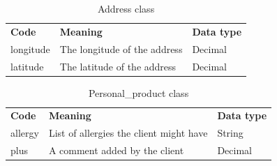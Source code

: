 \documentclass[12pt,a4paper]{report}
\begin{document}
	\begin{table}[H]
		\begin{center}
			\captionsetup[table]{skip=10pt}
			\caption{Address class}
			\setlength\doublerulesep{0.5pt}
			
			\begin{tabular}{|  p{5cm}|  p{6cm}|  p{4cm}|}
				\rowcolor{LightCyan}
				
				\hline
				\multicolumn{3}{c}{Address class}\\
				\hline 
				\textbf{Code} & \textbf{Meaning} & \textbf{Data type} 
				\\ \hline
				
				longitude &                        
				The longitude of the address &                        
				Decimal  
				\\ \hline
				
				latitude &                        
				The latitude of the address &                        
				Decimal            
				
				\\ \hline
				
				
			\end{tabular}
			
		\end{center}
	\end{table}
	\begin{table}[H]
		\begin{center}
			\captionsetup[table]{skip=10pt}
			\caption{Personal\_product class}
			\setlength\doublerulesep{0.5pt}
			
			\begin{tabular}{|  p{5cm}|  p{6cm}|  p{4cm}|}
				\rowcolor{LightCyan}
				
				\hline
				\multicolumn{3}{c}{Personal\_product class}\\
				\hline 
				\textbf{Code} & \textbf{Meaning} & \textbf{Data type} 
				\\ \hline
				
				allergy &                        
				List of allergies the client might have &                        
				String  
				\\ \hline
				
				plus &                        
				A comment added by the client &                        
				Decimal            
				
				\\ \hline
				
				
			\end{tabular}
			
		\end{center}
	\end{table}
\end{document}

